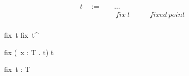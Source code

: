 
\begin{frame}
  \begin{mdframed}[frametitle={Terms}]
\begin{displaymath}
    \begin{aligned}
t \quad:=\quad& \ldots &\\
  & ~ fix~t \quad\quad &fixed~point\\
    \end{aligned}
\end{displaymath}
  \end{mdframed}
\end{frame}

\begin{frame}
  \begin{mdframed}[frametitle={Small-step semantics}]

  {fix~t \longrightarrow fix~t^{\prime}}

  \infrule[E-FixBeta]
  {}
  {fix
    \left(\lambda~x {:} T . t\right)
    \longrightarrow {}t}

  \end{mdframed}
\end{frame}

\begin{frame}
  \begin{mdframed}[frametitle={Typing rules}]

  {\vdash fix~t {:} T}

  \end{mdframed}
\end{frame}